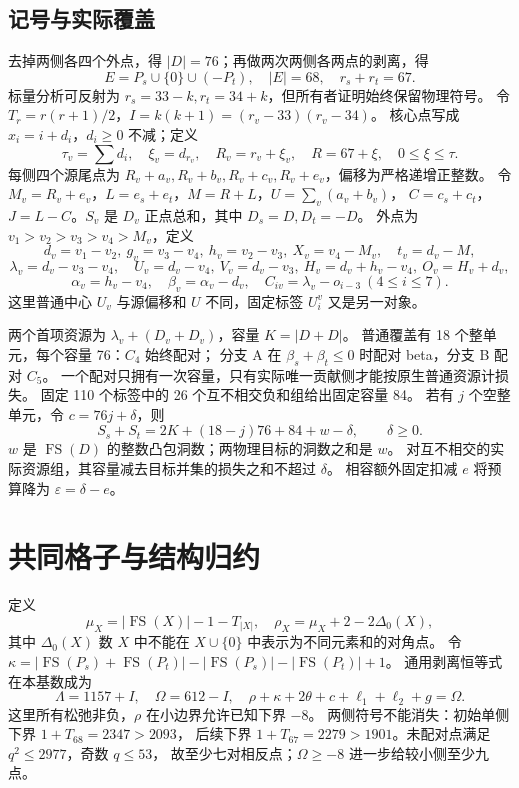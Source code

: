 \documentclass[11pt,a4paper]{article}
\newcommand{\FS}{\operatorname{FS}}
\newcommand{\eps}{\varepsilon}
\begin{document}
\subsection{记号与实际覆盖}
去掉两侧各四个外点，得 $|D|=76$；再做两次两侧各两点的剥离，得
\[
 E=P_s\cup\{0\}\cup(-P_t),\quad |E|=68,\quad r_s+r_t=67.
\]
标量分析可反射为 $r_s=33-k,r_t=34+k$，但所有者证明始终保留物理符号。
令 $T_r=r(r+1)/2$，$I=k(k+1)=(r_v-33)(r_v-34)$。
核心点写成 $x_i=i+d_i$，$d_i\ge0$ 不减；定义
\[
 \tau_v=\sum d_i,\quad \xi_v=d_{r_v},\quad R_v=r_v+\xi_v,
 \quad R=67+\xi,\quad 0\le\xi\le\tau.
\]
每侧四个源尾点为 $R_v+a_v,R_v+b_v,R_v+c_v,R_v+e_v$，偏移为严格递增正整数。
令 $M_v=R_v+e_v$，$L=e_s+e_t$，$M=R+L$，$U=\sum_v(a_v+b_v)$，
$C=c_s+c_t$，$J=L-C$。$S_v$ 是 $D_v$ 正点总和，其中 $D_s=D,D_t=-D$。
外点为 $v_1>v_2>v_3>v_4>M_v$，定义
\[
 d_v=v_1-v_2,\ g_v=v_3-v_4,\ h_v=v_2-v_3,\ X_v=v_4-M_v,
 \quad t_v=d_v-M,
\]
\[
 \lambda_v=d_v-v_3-v_4,\quad
 U_v=d_v-v_4,\ V_v=d_v-v_3,\ H_v=d_v+h_v-v_4,\ O_v=H_v+d_v,
\]
\[
 \alpha_v=h_v-v_4,\quad\beta_v=\alpha_v-d_v,
 \quad C_{iv}=\lambda_v-o_{i-3}\ (4\le i\le7).
\]
这里普通中心 $U_v$ 与源偏移和 $U$ 不同，固定标签 $U_i^v$ 又是另一对象。

两个首项资源为 $\lambda_v+(D_v+D_v)$，容量 $K=|D+D|$。
普通覆盖有 18 个整单元，每个容量 76：$C_4$ 始终配对；
分支 A 在 $\beta_s+\beta_t\le0$ 时配对 beta，分支 B 配对 $C_5$。
一个配对只拥有一次容量，只有实际唯一贡献侧才能按原生普通资源计损失。
固定 110 个标签中的 26 个互不相交负和组给出固定容量 84。
若有 $j$ 个空整单元，令 $c=76j+\delta$，则
\begin{equation}\label{eq:source-mass}
 S_s+S_t=2K+(18-j)76+84+w-\delta,\qquad \delta\ge0.
\end{equation}
$w$ 是 $\FS(D)$ 的整数凸包洞数；两物理目标的洞数之和是 $w$。
对互不相交的实际资源组，其容量减去目标并集的损失之和不超过 $\delta$。
相容额外固定扣减 $e$ 将预算降为 $\eps=\delta-e$。

\section{共同格子与结构归约}
定义
\[
 \mu_X=|\FS(X)|-1-T_{|X|},\quad
 \rho_X=\mu_X+2-2\Delta_0(X),
\]
其中 $\Delta_0(X)$ 数 $X$ 中不能在 $X\cup\{0\}$ 中表示为不同元素和的对角点。
令 $\kappa=|\FS(P_s)+\FS(P_t)|-|\FS(P_s)|-|\FS(P_t)|+1$。
通用剥离恒等式在本基数成为
\[
 \Lambda=1157+I,\quad\Omega=612-I,
 \quad\rho+\kappa+2\theta+c+\ell_1+\ell_2+g=\Omega.
\]
这里所有松弛非负，$\rho$ 在小边界允许已知下界 $-8$。
两侧符号不能消失：初始单侧下界 $1+T_{68}=2347>2093$，
后续下界 $1+T_{67}=2279>1901$。未配对点满足 $q^2\le2977$，奇数 $q\le53$，
故至少七对相反点；$\Omega\ge-8$ 进一步给较小侧至少九点。
\end{document}
